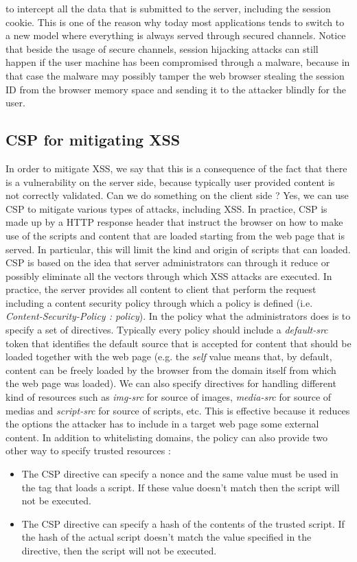 to intercept all the data that is submitted to the server, including the session cookie. This is one of the reason why today most applications tends to switch to a new model where everything is always served through secured channels. Notice that beside the usage of secure channels, session hijacking attacks can still happen if the user machine has been compromised through a malware, because in that case the malware may possibly tamper the web browser stealing the session ID from the browser memory space and sending it to the attacker blindly for the user.

\subsection{CSP for mitigating XSS}
In order to mitigate XSS, we say that this is a consequence of the fact that there is a vulnerability on the server side, because typically user provided content is not correctly validated. Can we do something on the client side ? Yes, we can use CSP to mitigate various types of attacks, including XSS. In practice, CSP is made up by a HTTP response header that instruct the browser on how to make use of the scripts and content that are loaded starting from the web page that is served. In particular, this will limit the kind and origin of scripts that can loaded. CSP is based on the idea that server administrators can through it reduce or possibly eliminate all the vectors through which XSS attacks are executed. In practice, the server provides all content to client that perform the request including a content security policy through which a policy is defined (i.e. \textit{Content-Security-Policy : policy}). In the policy what the administrators does is to specify a set of directives. Typically every policy should include a \textit{default-src} token that identifies the default source that is accepted for content that should be loaded together with the web page (e.g. the \textit{self} value means that, by default, content can be freely loaded by the browser from the domain itself from which the web page was loaded). We can also specify directives for handling different kind of resources such as \textit{img-src} for source of images, \textit{media-src} for source of medias and \textit{script-src} for source of scripts, etc. This is effective because it reduces the options the attacker has to include in a target web page some external content. In addition to whitelisting domains, the policy can also provide two other way to specify trusted resources :
\begin{itemize}
\item The CSP directive can specify a nonce and the same value must be used in the tag that loads a script. If these value doesn't match then the script will not be executed.
\item The CSP directive can specify a hash of the contents of the trusted script. If the hash of the actual script doesn't match the value specified in the directive, then the script will not be executed.
\end{itemize}

